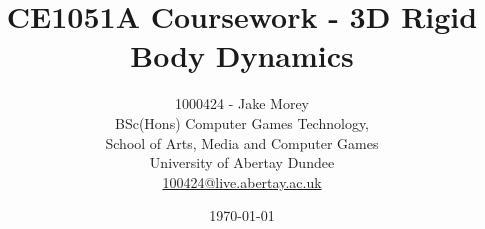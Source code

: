 \title{CE1051A Coursework - 3D Rigid Body Dynamics}
\author{1000424 - Jake Morey\\BSc(Hons) Computer Games Technology, \\School of Arts, Media and Computer Games
 \\ University of Abertay Dundee \\ \href{mailto:100424@live.abertay.ac.uk}{100424@live.abertay.ac.uk}}
\date{\today}

\maketitle
\thispagestyle{empty}
\doublespacing
\clearpage

\setcounter{page}{2}
\pagestyle{plain}